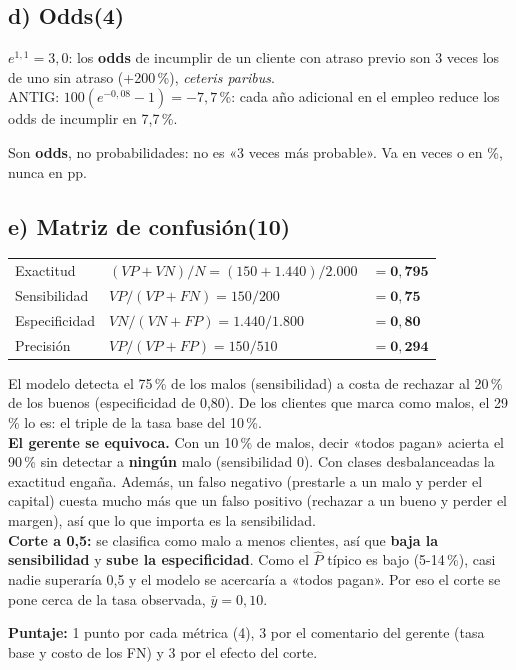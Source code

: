 \documentclass[11pt,a4paper]{article}
\newcommand{\sub}[2]{\subsection*{#1\hfill{\normalsize\textbf{(#2)}}}}
\begin{document}
\sub{d) Odds}{4}
\begin{ejemplar}
$e^{1{,}1}=3{,}0$: los \textbf{odds} de incumplir de un cliente con atraso previo son 3 veces los de uno sin atraso (+200\,\%), \emph{ceteris paribus}.\\
ANTIG: $100(e^{-0{,}08}-1)=-7{,}7\,\%$: cada año adicional en el empleo reduce los odds de incumplir en 7,7\,\%.
\end{ejemplar}
\begin{trampa}
Son \textbf{odds}, no probabilidades: no es «3 veces más probable». Va en veces o en \%, nunca en pp.
\end{trampa}

\sub{e) Matriz de confusión}{10}
\begin{center}\small
\renewcommand{\arraystretch}{1.25}
\begin{tabular}{lll}\toprule
Exactitud & $(VP+VN)/N=(150+1.440)/2.000$ & $=\mathbf{0{,}795}$\\
Sensibilidad & $VP/(VP+FN)=150/200$ & $=\mathbf{0{,}75}$\\
Especificidad & $VN/(VN+FP)=1.440/1.800$ & $=\mathbf{0{,}80}$\\
Precisión & $VP/(VP+FP)=150/510$ & $=\mathbf{0{,}294}$\\\bottomrule
\end{tabular}
\end{center}
\begin{ejemplar}
El modelo detecta el 75\,\% de los malos (sensibilidad) a costa de rechazar al 20\,\% de los buenos (especificidad de 0,80). De los clientes que marca como malos, el 29\,\% lo es: el triple de la tasa base del 10\,\%.\\
\textbf{El gerente se equivoca.} Con un 10\,\% de malos, decir «todos pagan» acierta el 90\,\% sin detectar a \textbf{ningún} malo (sensibilidad 0). Con clases desbalanceadas la exactitud engaña. Además, un falso negativo (prestarle a un malo y perder el capital) cuesta mucho más que un falso positivo (rechazar a un bueno y perder el margen), así que lo que importa es la sensibilidad.\\
\textbf{Corte a 0,5:} se clasifica como malo a menos clientes, así que \textbf{baja la sensibilidad} y \textbf{sube la especificidad}. Como el $\hat P$ típico es bajo (5-14\,\%), casi nadie superaría 0,5 y el modelo se acercaría a «todos pagan». Por eso el corte se pone cerca de la tasa observada, $\bar y=0{,}10$.
\end{ejemplar}
\textbf{Puntaje:} 1 punto por cada métrica (4), 3 por el comentario del gerente (tasa base y costo de los FN) y 3 por el efecto del corte.
\end{document}
